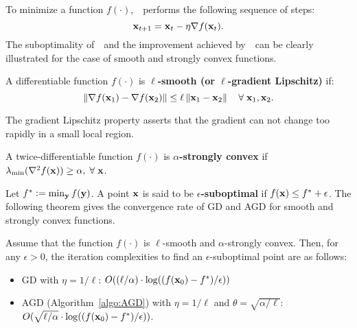 To minimize a function $f(\cdot)$,~\gd ~performs the following sequence of steps:
\begin{equation*}
\mathbf{x}_{t+1} = \mathbf{x}_{t}- \eta \nabla f(\mathbf{x}_t).
\end{equation*}
The suboptimality of~\gd~and the improvement achieved by~\nag~can be clearly illustrated for the case of smooth and strongly convex functions. %
\begin{definition}\label{def:smooth}
A differentiable function $f(\cdot)$ is \textbf{$\ell$-smooth (or $\ell$-gradient Lipschitz)} if:
\begin{equation*}
\left\|{\nabla f(\mathbf{x}_1) - \nabla f(\mathbf{x}_2)}\right\| \le \ell \left\|{\mathbf{x}_1 - \mathbf{x}_2}\right\| \quad \forall \; \mathbf{x}_1, \mathbf{x}_2.
\end{equation*}
\end{definition}
\noindent
The gradient Lipschitz property asserts that the gradient can not change too rapidly in a small local region.
\begin{definition}\label{def:convex}
A twice-differentiable function $f(\cdot)$ is \textbf{$\alpha$-strongly convex} if
$\lambda_{\min}(\nabla^2 f(\mathbf{x})) \ge \alpha, \;  \forall \; \mathbf{x}$.
\end{definition}
Let $f^* \mathrel{\mathop:}= \min_{\mathbf{y}}f(\mathbf{y})$. A point $\mathbf{x}$ is said to be \textbf{$\epsilon$-suboptimal} if $f(\mathbf{x})  \le  f^* + \epsilon$. The following theorem gives the convergence rate of GD and AGD for smooth and strongly convex functions.
\begin{theorem}\label{thm:gd_convex}
Assume that the function $f(\cdot)$ is $\ell$-smooth and $\alpha$-strongly convex. Then, for any $\epsilon>0$,
the iteration complexities to find an $\epsilon$-suboptimal point are as follows:
\begin{itemize}
\item GD with $\eta  = 1/\ell$: \quad $O((\ell/\alpha) \cdot \log ((f(\mathbf{x}_0) - f^*)/\epsilon))$
\item AGD (Algorithm~\ref{algo:AGD}) with $\eta = 1/\ell$ and $\theta = \sqrt{\alpha/\ell}$:
\quad$O(\sqrt{\ell/\alpha} \cdot \log ((f(\mathbf{x}_0) - f^*)/\epsilon))$.
\end{itemize}
\end{theorem}

